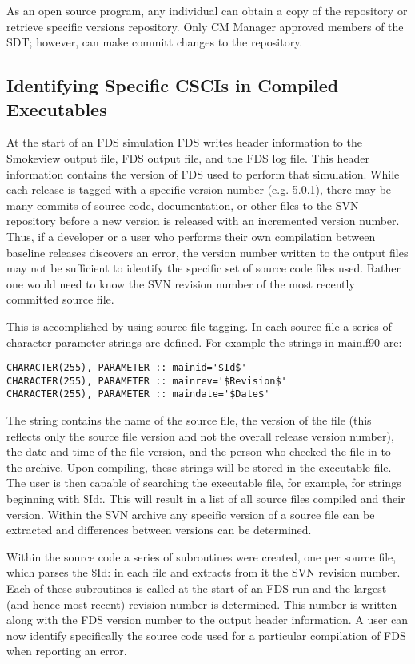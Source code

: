 \documentclass[11pt]{book}
\begin{document}
As an open source program, any individual can obtain a copy of the repository or retrieve specific versions
repository.  Only CM Manager approved members of the SDT; however, can make committ changes to the repository.

\subsection{Identifying Specific CSCIs in Compiled Executables}

At the start of an FDS simulation FDS writes header information to the Smokeview output file, FDS output file,
and the FDS log file.  This header information contains the version of FDS used to perform that simulation.
While each release is tagged with a specific version number (e.g. 5.0.1), there may be many commits of source
code, documentation, or other files to the SVN repository before a new version is released with an incremented
version number.  Thus, if a developer or a user who performs their own compilation between baseline releases
discovers an error, the version number written to the output files may not be sufficient to identify the
specific set of source code files used.  Rather one would need to know the SVN revision number of the most
recently committed source file.

This is accomplished by using source file tagging.  In each source file a series of character parameter
strings are defined.  For example the strings in main.f90 are:

\footnotesize
\begin{verbatim}
CHARACTER(255), PARAMETER :: mainid='$Id$'
CHARACTER(255), PARAMETER :: mainrev='$Revision$'
CHARACTER(255), PARAMETER :: maindate='$Date$'
\end{verbatim}
\normalsize

The string contains the name of the source file, the version of the file (this reflects only the source
file version and not the overall release version number), the date and time of the file version, and
the person who checked the file in to the archive.  Upon compiling, these strings will be stored in the
executable file.  The user is then capable of searching the executable file, for example, for strings
beginning with {\ct \$Id:}.  This will result in a list of all source files compiled and their version.
Within the SVN archive any specific version of a source file can be extracted and differences between
versions can be determined.

Within the source code a series of subroutines were created, one per source file, which parses the {\ct \$Id:} in
each file and extracts from it the SVN revision number.  Each of these subroutines is called at the start
of an FDS run and the largest (and hence most recent) revision number is determined.  This number is written
along with the FDS version number to the output header information.  A user can now identify specifically
the source code used for a particular compilation of FDS when reporting an error.
\end{document}
